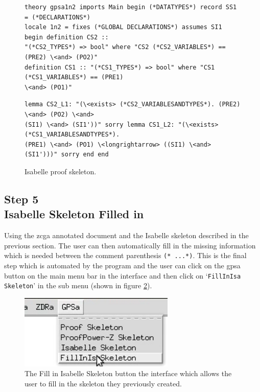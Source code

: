 \begin{figure}[H]
\centering
\begin{minipage}{0.45\textwidth}
\centering
\begin{scriptsize}
\begin{BVerbatim}
theory gpsa1n2 imports Main begin (*DATATYPES*) record SS1 = (*DECLARATIONS*)
locale 1n2 = fixes (*GLOBAL DECLARATIONS*) assumes SI1 begin definition CS2 ::
"(*CS2_TYPES*) => bool" where "CS2 (*CS2_VARIABLES*) == (PRE2) \<and> (PO2)"
definition CS1 :: "(*CS1_TYPES*) => bool" where "CS1 (*CS1_VARIABLES*) == (PRE1)
\<and> (PO1)"
\end{BVerbatim}
\end{scriptsize}
\end{minipage}\hfill
\begin{minipage}{0.45\textwidth}
\begin{scriptsize}
\begin{BVerbatim}
lemma CS2_L1: "(\<exists> (*CS2_VARIABLESANDTYPES*). (PRE2) \<and> (PO2) \<and>
(SI1) \<and> (SI1'))" sorry lemma CS1_L2: "(\<exists> (*CS1_VARIABLESANDTYPES*).
(PRE1) \<and> (PO1) \<longrightarrow> ((SI1) \<and> (SI1')))" sorry end end
\end{BVerbatim}
\end{scriptsize}
\end{minipage}
\caption{Isabelle proof skeleton. \label{fig:isaFullexample}}
\end{figure}

\subsection{Step 5\\Isabelle Skeleton Filled in}

Using the \gls{zcga} annotated document and the Isabelle skeleton described in
the previous section. The user can then automatically fill in the missing
information which is needed between the comment parenthesis \verb|(* ...*)|.
This is the final step which is automated by the program and the user can click
on the \gls{gpsa} button on the main menu bar in the interface and then click on
`\texttt{FillInIsa Skeleton}' in the sub menu (shown in figure
\ref{fig:fillinisa}).

\begin{figure}[H]
\centering
\includegraphics[scale=0.45]{Figures/fullexample/fillinisa.png}
\caption{The Fill in Isabelle Skeleton button the interface which allows the user to fill in the skeleton they previously created. \label{fig:fillinisa}}
\end{figure}

